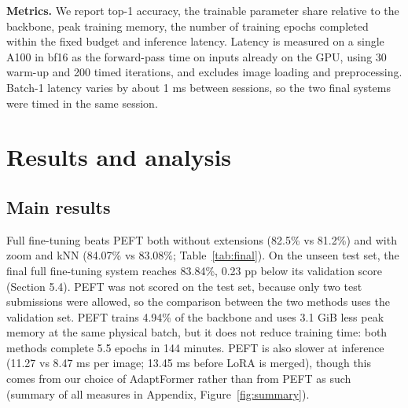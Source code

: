 \textbf{Metrics.} We report top-1 accuracy, the trainable parameter share relative to the backbone, peak training memory, the number of training epochs completed within the fixed budget and inference latency. Latency is measured on a single A100 in bf16 as the forward-pass time on inputs already on the GPU, using 30 warm-up and 200 timed iterations, and excludes image loading and preprocessing. Batch-1 latency varies by about 1 ms between sessions, so the two final systems were timed in the same session.

\section{Results and analysis}\label{results-and-analysis}

\subsection{Main results}\label{main-results}

Full fine-tuning beats PEFT both without extensions (82.5\% vs 81.2\%) and with zoom and kNN (84.07\% vs 83.08\%; Table~\ref{tab:final}). On the unseen test set, the final full fine-tuning system reaches 83.84\%, 0.23 pp below its validation score (Section 5.4). PEFT was not scored on the test set, because only two test submissions were allowed, so the comparison between the two methods uses the validation set. PEFT trains 4.94\% of the backbone and uses 3.1 GiB less peak memory at the same physical batch, but it does not reduce training time: both methods complete 5.5 epochs in 144 minutes. PEFT is also slower at inference (11.27 vs 8.47 ms per image; 13.45 ms before LoRA is merged), though this comes from our choice of AdaptFormer rather than from PEFT as such (summary of all measures in Appendix, Figure~\ref{fig:summary}).





